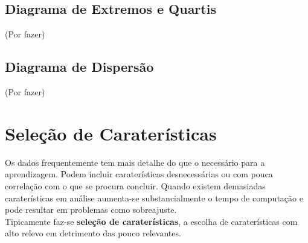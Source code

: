 \documentclass[]{report}
\begin{document}
\subsection{Diagrama de Extremos e Quartis}
(Por fazer)
\subsection{Diagrama de Dispersão}
(Por fazer)
\clearpage
\section{Seleção de Caraterísticas}
Os dados frequentemente tem mais detalhe do que o necessário para a aprendizagem. Podem incluir caraterísticas desnecessárias ou com pouca correlação com o que se procura concluir.
Quando existem demasiadas caraterísticas em análise aumenta-se substancialmente o tempo de computação e pode resultar em problemas como sobreajuste.\\
Tipicamente faz-se \textbf{seleção de caraterísticas}, a escolha de caraterísticas com alto relevo em detrimento das pouco relevantes.
\end{document}
